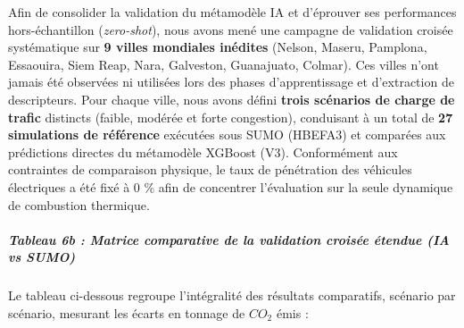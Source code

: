 \documentclass[10pt, a4paper]{article}
\begin{document}
Afin de consolider la validation du métamodèle IA et d'éprouver ses
performances hors-échantillon (\emph{zero-shot}), nous avons mené une
campagne de validation croisée systématique sur \textbf{9 villes
mondiales inédites} (Nelson, Maseru, Pamplona, Essaouira, Siem Reap,
Nara, Galveston, Guanajuato, Colmar). Ces villes n'ont jamais été
observées ni utilisées lors des phases d'apprentissage et d'extraction
de descripteurs. Pour chaque ville, nous avons défini \textbf{trois
scénarios de charge de trafic} distincts (faible, modérée et forte
congestion), conduisant à un total de \textbf{27 simulations de
référence} exécutées sous SUMO (HBEFA3) et comparées aux prédictions
directes du métamodèle XGBoost (V3). Conformément aux contraintes de
comparaison physique, le taux de pénétration des véhicules électriques a
été fixé à 0 \% afin de concentrer l'évaluation sur la seule dynamique
de combustion thermique.

\subparagraph{Tableau 6b : Matrice comparative de la validation croisée
étendue (IA vs
SUMO)}\label{tableau-6b-matrice-comparative-de-la-validation-croisuxe9e-uxe9tendue-ia-vs-sumo}

Le tableau ci-dessous regroupe l'intégralité des résultats comparatifs,
scénario par scénario, mesurant les écarts en tonnage de \(CO_2\) émis :
\end{document}
